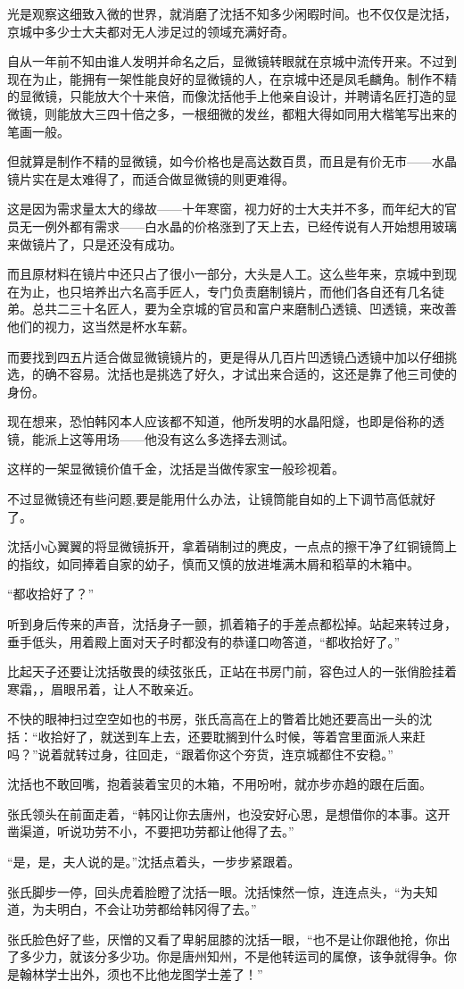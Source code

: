 光是观察这细致入微的世界，就消磨了沈括不知多少闲暇时间。也不仅仅是沈括，京城中多少士大夫都对无人涉足过的领域充满好奇。

自从一年前不知由谁人发明并命名之后，显微镜转眼就在京城中流传开来。不过到现在为止，能拥有一架性能良好的显微镜的人，在京城中还是凤毛麟角。制作不精的显微镜，只能放大个十来倍，而像沈括他手上他亲自设计，并聘请名匠打造的显微镜，则能放大三四十倍之多，一根细微的发丝，都粗大得如同用大楷笔写出来的笔画一般。

但就算是制作不精的显微镜，如今价格也是高达数百贯，而且是有价无市——水晶镜片实在是太难得了，而适合做显微镜的则更难得。

这是因为需求量太大的缘故——十年寒窗，视力好的士大夫并不多，而年纪大的官员无一例外都有需求——白水晶的价格涨到了天上去，已经传说有人开始想用玻璃来做镜片了，只是还没有成功。

而且原材料在镜片中还只占了很小一部分，大头是人工。这么些年来，京城中到现在为止，也只培养出六名高手匠人，专门负责磨制镜片，而他们各自还有几名徒弟。总共二三十名匠人，要为全京城的官员和富户来磨制凸透镜、凹透镜，来改善他们的视力，这当然是杯水车薪。

而要找到四五片适合做显微镜镜片的，更是得从几百片凹透镜凸透镜中加以仔细挑选，的确不容易。沈括也是挑选了好久，才试出来合适的，这还是靠了他三司使的身份。

现在想来，恐怕韩冈本人应该都不知道，他所发明的水晶阳燧，也即是俗称的透镜，能派上这等用场——他没有这么多选择去测试。

这样的一架显微镜价值千金，沈括是当做传家宝一般珍视着。

不过显微镜还有些问题,要是能用什么办法，让镜筒能自如的上下调节高低就好了。

沈括小心翼翼的将显微镜拆开，拿着硝制过的麂皮，一点点的擦干净了红铜镜筒上的指纹，如同捧着自家的幼子，慎而又慎的放进堆满木屑和稻草的木箱中。

“都收拾好了？”

听到身后传来的声音，沈括身子一颤，抓着箱子的手差点都松掉。站起来转过身，垂手低头，用着殿上面对天子时都没有的恭谨口吻答道，“都收拾好了。”

比起天子还要让沈括敬畏的续弦张氏，正站在书房门前，容色过人的一张俏脸挂着寒霜，，眉眼吊着，让人不敢亲近。

不快的眼神扫过空空如也的书房，张氏高高在上的瞥着比她还要高出一头的沈括：“收拾好了，就送到车上去，还要耽搁到什么时候，等着宫里面派人来赶吗？”说着就转过身，往回走，“跟着你这个夯货，连京城都住不安稳。”

沈括也不敢回嘴，抱着装着宝贝的木箱，不用吩咐，就亦步亦趋的跟在后面。

张氏领头在前面走着，“韩冈让你去唐州，也没安好心思，是想借你的本事。这开凿渠道，听说功劳不小，不要把功劳都让他得了去。”

“是，是，夫人说的是。”沈括点着头，一步步紧跟着。

张氏脚步一停，回头虎着脸瞪了沈括一眼。沈括悚然一惊，连连点头，“为夫知道，为夫明白，不会让功劳都给韩冈得了去。”

张氏脸色好了些，厌憎的又看了卑躬屈膝的沈括一眼，“也不是让你跟他抢，你出了多少力，就该分多少功。你是唐州知州，不是他转运司的属僚，该争就得争。你是翰林学士出外，须也不比他龙图学士差了！”

